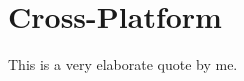 %
%
% 
% 

\chapter{Cross-Platform}

\label{chap:Cross-Platform}

\begin{displayquote}
  This is a very elaborate quote by me.
\end{displayquote}
